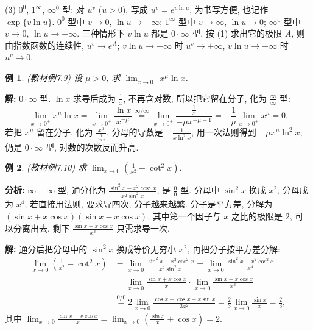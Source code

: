 \documentclass[UTF8,openany]{ctexbook}
\theoremstyle{chinesetextbook}
\newtheorem{example}{例}[section]
\newenvironment{cnsolution}{\par\indent\textbf{解:} \ignorespaces}{\par}
\begin{document}
(3) $0^0$, $1^\infty$, $\infty^0$ 型: 对 $u^v$ ($u>0$), 写成 $u^v=e^{v\ln u}$, 为书写方便, 也记作 $\exp\{v\ln u\}$. $0^0$ 型中 $v\to0$, $\ln u\to-\infty$; $1^\infty$ 型中 $v\to\infty$, $\ln u\to0$; $\infty^0$ 型中 $v\to0$, $\ln u\to+\infty$. 三种情形下 $v\ln u$ 都是 $0\cdot\infty$ 型. 按 (1) 求出它的极限 $A$, 则由指数函数的连续性, $u^v\to e^A$; $v\ln u\to+\infty$ 时 $u^v\to+\infty$, $v\ln u\to-\infty$ 时 $u^v\to0$.
\begin{example}\label{ex:c2-7-9}
\textnormal{(教材例7.9)} 设 $\mu>0$, 求 $\displaystyle\lim_{x\to0^+}x^\mu\ln x$.
\end{example}
\begin{cnsolution}
$0\cdot\infty$ 型. $\ln x$ 求导后成为 $\displaystyle\frac1x$, 不再含对数, 所以把它留在分子, 化为 $\displaystyle\frac\infty\infty$ 型:
\[
\lim_{x\to0^+}x^\mu\ln x=\lim_{x\to0^+}\frac{\ln x}{x^{-\mu}}\overset{\infty/\infty}{=}\lim_{x\to0^+}\frac{\frac1x}{-\mu x^{-\mu-1}}=-\frac1\mu\lim_{x\to0^+}x^\mu=0.
\]
若把 $x^\mu$ 留在分子, 化为 $\displaystyle\frac{x^\mu}{\frac1{\ln x}}$, 分母的导数是 $\displaystyle-\frac1{x\ln^2x}$, 用一次法则得到 $-\mu x^\mu\ln^2x$, 仍是 $0\cdot\infty$ 型, 对数的次数反而升高.
\end{cnsolution}
\begin{example}\label{ex:c2-7-10}
\textnormal{(教材例7.10)} 求 $\displaystyle\lim_{x\to0}\left(\frac1{x^2}-\cot^2x\right)$.
\end{example}
\par\indent\textbf{分析:} $\infty-\infty$ 型, 通分化为 $\displaystyle\frac{\sin^2x-x^2\cos^2x}{x^2\sin^2x}$, 是 $\displaystyle\frac00$ 型. 分母中 $\sin^2x$ 换成 $x^2$, 分母成为 $x^4$; 若直接用法则, 要求导四次, 分子越来越繁. 分子是平方差, 分解为 $(\sin x+x\cos x)(\sin x-x\cos x)$, 其中第一个因子与 $x$ 之比的极限是 $2$, 可以分离出去, 剩下 $\displaystyle\frac{\sin x-x\cos x}{x^3}$ 只需求导一次.
\begin{cnsolution}
通分后把分母中的 $\sin^2x$ 换成等价无穷小 $x^2$, 再把分子按平方差分解:
\[
\begin{aligned}
\lim_{x\to0}\left(\frac1{x^2}-\cot^2x\right)&=\lim_{x\to0}\frac{\sin^2x-x^2\cos^2x}{x^2\sin^2x}=\lim_{x\to0}\frac{\sin^2x-x^2\cos^2x}{x^4}\\
&=\lim_{x\to0}\frac{\sin x+x\cos x}x\cdot\lim_{x\to0}\frac{\sin x-x\cos x}{x^3}\\
&\overset{0/0}{=}2\lim_{x\to0}\frac{\cos x-\cos x+x\sin x}{3x^2}=\frac23\lim_{x\to0}\frac{\sin x}x=\frac23,
\end{aligned}
\]
其中 $\displaystyle\lim_{x\to0}\frac{\sin x+x\cos x}x=\lim_{x\to0}\left(\frac{\sin x}x+\cos x\right)=2$.
\end{cnsolution}
\end{document}
